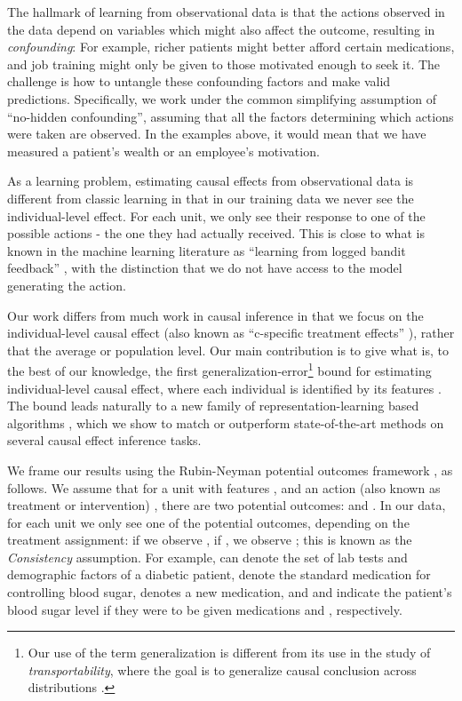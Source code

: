 \documentclass{article}
\begin{document}
The hallmark of learning from observational data is that the actions observed in the data depend on variables which might also affect the outcome, resulting in \emph{confounding}: For example, richer patients might better afford certain medications, and job training might only be given to those motivated enough to seek it. The challenge is how to untangle these confounding factors and make valid predictions. Specifically, we work under the common simplifying assumption of ``no-hidden confounding'', assuming that all the factors determining which actions were taken are observed. In the examples above, it would mean that we have measured a patient's wealth or an employee's motivation.

As a learning problem, estimating causal effects from observational data is different from classic learning in that in our training data we never see the individual-level effect. For each unit, we only see their response to one of the possible actions - the one they had actually received. This is close to what is known in the machine learning literature as ``learning from logged bandit feedback'' \citep{strehl2010learning,swaminathan2015batch}, with the distinction that we do not have access to the model generating the action.


Our work differs from much work in causal inference in that we focus on the individual-level causal effect (also known as ``c-specific treatment effects'' \citet{shpitser2006ident,pearl2015detecting}), rather that the average or population level. Our main contribution is to give what is, to the best of our knowledge, the first generalization-error\footnote{Our use of the term generalization is different from its use in the study of \emph{transportability}, where the goal is to generalize causal conclusion across distributions \citep{bareinboim2016causal}.} bound for estimating individual-level causal effect, where each individual is identified by its features . The bound leads naturally to a new family of representation-learning based algorithms \cite{bengio2013representation}, which we show to match or outperform state-of-the-art methods on several causal effect inference tasks.


We frame our results using the Rubin-Neyman potential outcomes framework \cite{rubin2011causal}, as follows. We assume that for a unit with features , and an action (also known as treatment or intervention) , there are two potential outcomes:  and . In our data, for each unit we only see one of the potential outcomes, depending on the treatment assignment: if  we observe , if , we observe ; this is known as the \emph{Consistency} assumption. For example,  can denote the set of lab tests and demographic factors of a diabetic patient,  denote the standard medication for controlling blood sugar,  denotes a new medication, and  and  indicate the patient's blood sugar level if they were to be given medications  and , respectively.
\end{document}
